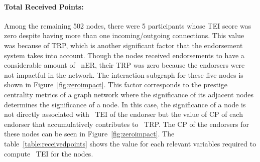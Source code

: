 \paragraph{Total Received Points:} Among the remaining 502 nodes, there were 5
participants whose \ac{TEI} score was zero despite having more than one
incoming/outgoing connections. This value was because of \ac{TRP}, which is
another significant factor that the endorsement system takes into account.
Though the nodes received endorsements to have a considerable amount of
~\ac{nER}, their \ac{TRP} was zero because the endorsers were not impactful in
the network. The interaction subgraph for these five nodes is shown in
Figure~\ref{fig:zeroimpact}. This factor corresponds to the prestige centrality
metrics of a graph network where the significance of its adjacent nodes
determines the significance of a node. In this case, the significance of a node
is not directly associated with ~\ac{TEI} of the endorser but the value of
\ac{CP} of each endorser that accumulatively contributes to ~\ac{TRP}. The
\ac{CP} of the endorsers for these nodes can be seen in
Figure~\ref{fig:zeroimpact}. The table~\ref{table:receivedpoints} shows the
value for each relevant variables required to compute ~\ac{TEI} for the nodes.

